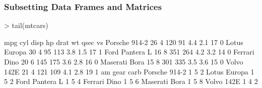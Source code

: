 \documentclass[10pt,slidestop,mathserif,c]{beamer}
\begin{document}
\begin{frame}
	\frametitle{Subsetting Data Frames and Matrices}
\begin{Schunk}
\begin{Sinput}
> tail(mtcars)
\end{Sinput}
\begin{Soutput}
               mpg cyl disp  hp drat  wt qsec vs
Porsche 914-2   26   4  120  91  4.4 2.1   17  0
Lotus Europa    30   4   95 113  3.8 1.5   17  1
Ford Pantera L  16   8  351 264  4.2 3.2   14  0
Ferrari Dino    20   6  145 175  3.6 2.8   16  0
Maserati Bora   15   8  301 335  3.5 3.6   15  0
Volvo 142E      21   4  121 109  4.1 2.8   19  1
               am gear carb
Porsche 914-2   1    5    2
Lotus Europa    1    5    2
Ford Pantera L  1    5    4
Ferrari Dino    1    5    6
Maserati Bora   1    5    8
Volvo 142E      1    4    2
\end{Soutput}
\end{Schunk}
\end{frame}
\end{document}
